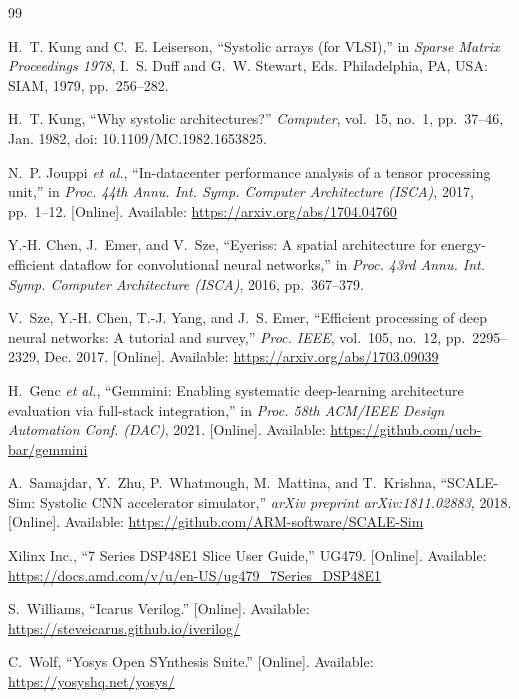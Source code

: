 \documentclass[conference,a4paper]{IEEEtran}
\begin{document}
\begin{thebibliography}{99}
\footnotesize

H.~T. Kung and C.~E. Leiserson, ``Systolic arrays (for VLSI),'' in \emph{Sparse Matrix Proceedings 1978}, I.~S. Duff and G.~W. Stewart, Eds. Philadelphia, PA, USA: SIAM, 1979, pp.~256--282.

H.~T. Kung, ``Why systolic architectures?'' \emph{Computer}, vol.~15, no.~1, pp.~37--46, Jan. 1982, doi: 10.1109/MC.1982.1653825.

N.~P. Jouppi \emph{et al.}, ``In-datacenter performance analysis of a tensor processing unit,'' in \emph{Proc. 44th Annu. Int. Symp. Computer Architecture (ISCA)}, 2017, pp.~1--12. [Online]. Available: \url{https://arxiv.org/abs/1704.04760}

Y.-H. Chen, J.~Emer, and V.~Sze, ``Eyeriss: A spatial architecture for energy-efficient dataflow for convolutional neural networks,'' in \emph{Proc. 43rd Annu. Int. Symp. Computer Architecture (ISCA)}, 2016, pp.~367--379.

V.~Sze, Y.-H. Chen, T.-J. Yang, and J.~S. Emer, ``Efficient processing of deep neural networks: A tutorial and survey,'' \emph{Proc. IEEE}, vol.~105, no.~12, pp.~2295--2329, Dec. 2017. [Online]. Available: \url{https://arxiv.org/abs/1703.09039}

H.~Genc \emph{et al.}, ``Gemmini: Enabling systematic deep-learning architecture evaluation via full-stack integration,'' in \emph{Proc. 58th ACM/IEEE Design Automation Conf. (DAC)}, 2021. [Online]. Available: \url{https://github.com/ucb-bar/gemmini}

A.~Samajdar, Y.~Zhu, P.~Whatmough, M.~Mattina, and T.~Krishna, ``SCALE-Sim: Systolic CNN accelerator simulator,'' \emph{arXiv preprint arXiv:1811.02883}, 2018. [Online]. Available: \url{https://github.com/ARM-software/SCALE-Sim}

Xilinx Inc., ``7 Series DSP48E1 Slice User Guide,'' UG479. [Online]. Available: \url{https://docs.amd.com/v/u/en-US/ug479_7Series_DSP48E1}

S.~Williams, ``Icarus Verilog.'' [Online]. Available: \url{https://steveicarus.github.io/iverilog/}

C.~Wolf, ``Yosys Open SYnthesis Suite.'' [Online]. Available: \url{https://yosyshq.net/yosys/}

\end{thebibliography}
\end{document}

